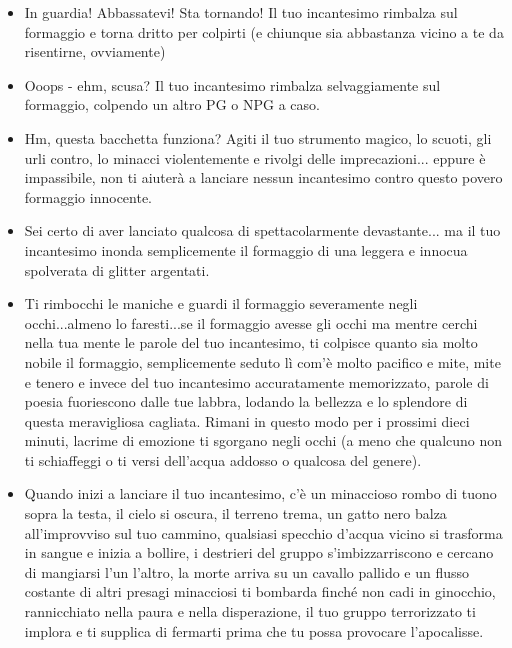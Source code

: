 \documentclass{article}
\begin{document}
\begin{itemize}
    \item In guardia! Abbassatevi! Sta tornando! Il tuo incantesimo rimbalza sul formaggio e torna dritto per colpirti (e chiunque sia abbastanza vicino a te da risentirne, ovviamente)
    \item Ooops - ehm, scusa? Il tuo incantesimo rimbalza selvaggiamente sul formaggio, colpendo un altro PG o NPG a caso.
    \item Hm, questa bacchetta funziona? Agiti il tuo strumento magico, lo scuoti, gli urli contro, lo minacci violentemente e rivolgi delle imprecazioni... eppure è impassibile, non ti aiuterà a lanciare nessun incantesimo contro questo povero formaggio innocente.
    \item Sei certo di aver lanciato qualcosa di spettacolarmente devastante... ma il tuo incantesimo inonda semplicemente il formaggio di una leggera e innocua spolverata di glitter argentati.
    \item Ti rimbocchi le maniche e guardi il formaggio severamente negli occhi...almeno lo faresti...se il formaggio avesse gli occhi ma mentre cerchi nella tua mente le parole del tuo incantesimo, ti colpisce quanto sia molto nobile il formaggio, semplicemente seduto lì com'è molto pacifico e mite, mite e tenero e invece del tuo incantesimo accuratamente memorizzato, parole di poesia fuoriescono dalle tue labbra, lodando la bellezza e lo splendore di questa meravigliosa cagliata. Rimani in questo modo per i prossimi dieci minuti, lacrime di emozione ti sgorgano negli occhi (a meno che qualcuno non ti schiaffeggi o ti versi dell'acqua addosso o qualcosa del genere).
    \item Quando inizi a lanciare il tuo incantesimo, c'è un minaccioso rombo di tuono sopra la testa, il cielo si oscura, il terreno trema, un gatto nero balza all'improvviso sul tuo cammino, qualsiasi specchio d'acqua vicino si trasforma in sangue e inizia a bollire, i destrieri del gruppo s’imbizzarriscono e cercano di mangiarsi l'un l'altro, la morte arriva su un cavallo pallido e un flusso costante di altri presagi minacciosi ti bombarda finché non cadi in ginocchio, rannicchiato nella paura e nella disperazione, il tuo gruppo terrorizzato ti implora e ti supplica di fermarti prima che tu possa provocare l'apocalisse.
\end{itemize}
\end{document}
